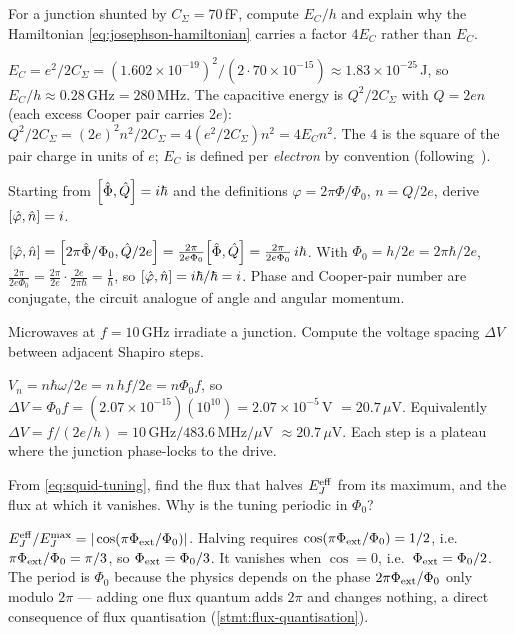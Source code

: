 \begin{exercise}
For a junction shunted by $C_\Sigma=70\,$fF, compute $E_C/h$ and
explain why the Hamiltonian \cref{eq:josephson-hamiltonian} carries a
factor $4E_C$ rather than $E_C$.
\begin{solution}
$E_C=e^2/2C_\Sigma=(1.602\times10^{-19})^2/(2\cdot70\times10^{-15})
\approx1.83\times10^{-25}\,$J, so $E_C/h\approx0.28\,$GHz$=280\,$MHz.
The capacitive energy is $Q^2/2C_\Sigma$ with $Q=2en$ (each excess
Cooper pair carries $2e$): $Q^2/2C_\Sigma=(2e)^2n^2/2C_\Sigma
=4(e^2/2C_\Sigma)n^2=4E_C n^2$. The $4$ is the square of the pair
charge in units of $e$; $E_C$ is defined per \emph{electron} by
convention (following~\cite{koch2007}).
\end{solution}
\end{exercise}

\begin{exercise}
Starting from $\comm{\op\Phi}{\op Q}=i\hbar$ and the definitions
$\varphi=2\pi\Phi/\Phi_0$, $n=Q/2e$, derive $\comm{\op\varphi}{\op n}=i$.
\begin{solution}
$\comm{\op\varphi}{\op n}=\comm{2\pi\op\Phi/\Phi_0}{\op Q/2e}
=\frac{2\pi}{2e\Phi_0}\comm{\op\Phi}{\op Q}
=\frac{2\pi}{2e\Phi_0}\,i\hbar$. With $\Phi_0=h/2e=2\pi\hbar/2e$,
$\frac{2\pi}{2e\Phi_0}=\frac{2\pi}{2e}\cdot\frac{2e}{2\pi\hbar}=\frac1\hbar$,
so $\comm{\op\varphi}{\op n}=i\hbar/\hbar=i$. Phase and Cooper-pair
number are conjugate, the circuit analogue of angle and angular
momentum.
\end{solution}
\end{exercise}

\begin{exercise}
Microwaves at $f=10\,$GHz irradiate a junction. Compute the voltage
spacing $\Delta V$ between adjacent Shapiro steps.
\begin{solution}
$V_n=n\hbar\omega/2e=n\,hf/2e=n\Phi_0 f$, so
$\Delta V=\Phi_0 f=(2.07\times10^{-15})(10^{10})=2.07\times10^{-5}\,$V
$=20.7\,\mu$V. Equivalently $\Delta V=f/(2e/h)=10\,$GHz$/483.6\,$MHz$/\mu$V
$\approx20.7\,\mu$V. Each step is a plateau where the junction
phase-locks to the drive.
\end{solution}
\end{exercise}

\begin{exercise}
From \cref{eq:squid-tuning}, find the flux that halves $E_J^{\rm eff}$
from its maximum, and the flux at which it vanishes. Why is the tuning
periodic in $\Phi_0$?
\begin{solution}
$E_J^{\rm eff}/E_J^{\rm max}=|\cos(\pi\Phi_{\rm ext}/\Phi_0)|$. Halving
requires $\cos(\pi\Phi_{\rm ext}/\Phi_0)=1/2$, i.e.\
$\pi\Phi_{\rm ext}/\Phi_0=\pi/3$, so $\Phi_{\rm ext}=\Phi_0/3$. It
vanishes when $\cos=0$, i.e.\ $\Phi_{\rm ext}=\Phi_0/2$. The period is
$\Phi_0$ because the physics depends on the phase
$2\pi\Phi_{\rm ext}/\Phi_0$ only modulo $2\pi$ --- adding one flux
quantum adds $2\pi$ and changes nothing, a direct consequence of flux
quantisation (\cref{stmt:flux-quantisation}).
\end{solution}
\end{exercise}

